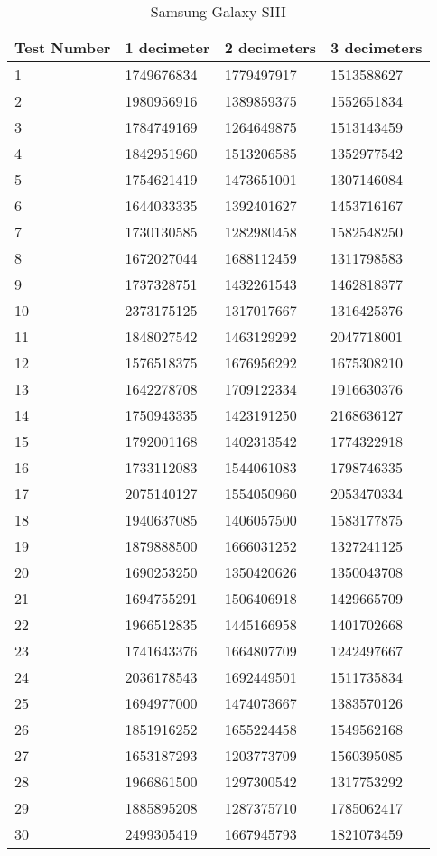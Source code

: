 	\begin{table}[ht!]
    		\caption{Samsung Galaxy SIII} \label{tab:distamceGoogleGlassFull}
		\centering \begin{tabularx}{\textwidth}{l|X|X|X} \hline
		Test Number & \textbf{1 decimeter} & \textbf{2 decimeters} & \textbf{3 decimeters} \\ \hline \hline
		
		1&	1749676834	&	1779497917	&	1513588627	\\ \hline
		2&	1980956916	&	1389859375	&	1552651834	\\ \hline
		3&	1784749169	&	1264649875	&	1513143459	\\ \hline
		4&	1842951960	&	1513206585	&	1352977542	\\ \hline
		5&	1754621419	&	1473651001	&	1307146084	\\ \hline
		6&	1644033335	&	1392401627	&	1453716167	\\ \hline
		7&	1730130585	&	1282980458	&	1582548250	\\ \hline
		8&	1672027044	&	1688112459	&	1311798583	\\ \hline
		9&	1737328751	&	1432261543	&	1462818377	\\ \hline
		10&	2373175125	&	1317017667	&	1316425376	\\ \hline
		11&	1848027542	&	1463129292	&	2047718001	\\ \hline
		12&	1576518375	&	1676956292	&	1675308210	\\ \hline
		13&	1642278708	&	1709122334	&	1916630376	\\ \hline
		14&	1750943335	&	1423191250	&	2168636127	\\ \hline
		15&	1792001168	&	1402313542	&	1774322918	\\ \hline
		16&	1733112083	&	1544061083	&	1798746335	\\ \hline
		17&	2075140127	&	1554050960	&	2053470334	\\ \hline
		18&	1940637085	&	1406057500	&	1583177875	\\ \hline
		19&	1879888500	&	1666031252	&	1327241125	\\ \hline
		20&	1690253250	&	1350420626	&	1350043708	\\ \hline
		21&	1694755291	&	1506406918	&	1429665709	\\ \hline
		22&	1966512835	&	1445166958	&	1401702668	\\ \hline
		23&	1741643376	&	1664807709	&	1242497667	\\ \hline
		24&	2036178543	&	1692449501	&	1511735834	\\ \hline
		25&	1694977000	&	1474073667	&	1383570126	\\ \hline
		26&	1851916252	&	1655224458	&	1549562168	\\ \hline
		27&	1653187293	&	1203773709	&	1560395085	\\ \hline
		28&	1966861500	&	1297300542	&	1317753292	\\ \hline
		29&	1885895208	&	1287375710	&	1785062417	\\ \hline
		30&	2499305419	&	1667945793	&	1821073459	\\ \hline

		\end{tabularx}
	\end{table}